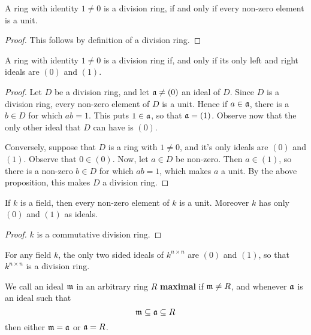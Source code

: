 \begin{proposition}\label{proposition_5.4.2}
  A ring with identity $1 \neq 0$ is a division ring, if and only if
  every non-zero element is a unit.
\end{proposition}
\begin{proof}
  This follows by definition of a division ring.
\end{proof}
\begin{corollary}
  A ring with identity $1 \neq 0$ is a division ring if, and only if
  its only left and right ideals are $(0)$ and $(1)$.
\end{corollary}
\begin{proof}
  Let $D$ be a division ring, and let $\mathfrak{a} \neq (0)$ an ideal of
  $D$. Since $D$ is a division ring, every non-zero element of $D$ is
  a unit. Hence if $a \in \mathfrak{a}$, there is a $b \in D$ for which $ab=1$.
  This puts $1 \in \mathfrak{a}$, so that $\mathfrak{a}=(1)$. Observe now that the only
  other ideal that $D$ can have is $(0)$.

  Conversely, suppose that $D$ is a ring with $1 \neq 0$, and it's
  only ideals are $(0)$ and $(1)$. Observe that $0 \in (0)$. Now, let
  $a \in D$ be non-zero. Then $a \in (1)$, so there is a non-zero $b
  \in D$ for which $ab=1$, which makes $a$ a unit. By the above proposition,
  this makes $D$ a division ring.
\end{proof}
\begin{corollary}
  If $k$ is a field, then every non-zero element of $k$ is a unit.
  Moreover $k$ has only $(0)$ and $(1)$ as ideals.
\end{corollary}
\begin{proof}
  $k$ is a commutative division ring.
\end{proof}

\begin{example}\label{example_5.14}
  For any field $k$, the only two sided ideals of $k^{n \times n}$ are $(0)$
  and $(1)$, so that $k^{n \times n}$ is a division ring.
\end{example}

\begin{definition}
  We call an ideal $\mathfrak{m}$ in an arbitrary ring $R$ \textbf{maximal} if
  $\mathfrak{m} \neq R$, and whenever $\mathfrak{a}$ is an ideal such that
  \begin{equation*}
    \mathfrak{m} \subseteq \mathfrak{a} \subseteq R
  \end{equation*}
  then either $\mathfrak{m}=\mathfrak{a}$ or $\mathfrak{a}=R$.
\end{definition}

